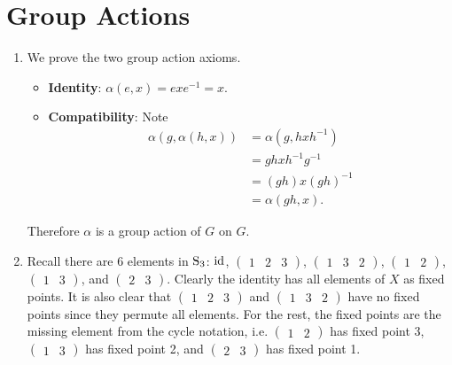\section{Group Actions}
\begin{enumerate}
    \item We prove the two group action axioms.
    \begin{itemize}
        \item \textbf{Identity}: $\alpha(e, x) = exe^{-1} = x$.
        \item \textbf{Compatibility}: Note
        \begin{align*}
            \alpha(g, \alpha(h, x)) &= \alpha(g, hxh^{-1})\\
            &= gh x h^{-1}g^{-1}\\
            &= (gh)x(gh)^{-1}\\
            &= \alpha(gh, x).
        \end{align*}
    \end{itemize}
    Therefore $\alpha$ is a group action of $G$ on $G$.

    \item Recall there are 6 elements in $\mathrm{S}_{3}$: $\mathrm{id}$, $\begin{pmatrix}1 & 2 & 3\end{pmatrix}$, $\begin{pmatrix}1 & 3 & 2\end{pmatrix}$, $\begin{pmatrix}1 & 2\end{pmatrix}$, $\begin{pmatrix}1 & 3\end{pmatrix}$, and $\begin{pmatrix}2 & 3\end{pmatrix}$. Clearly the identity has all elements of $X$ as fixed points. It is also clear that $\begin{pmatrix}1 & 2 & 3\end{pmatrix}$ and $\begin{pmatrix}1 & 3 & 2\end{pmatrix}$ have no fixed points since they permute all elements. For the rest, the fixed points are the missing element from the cycle notation, i.e. $\begin{pmatrix}1 & 2\end{pmatrix}$ has fixed point 3, $\begin{pmatrix}1 & 3\end{pmatrix}$ has fixed point 2, and $\begin{pmatrix}2 & 3\end{pmatrix}$ has fixed point 1.


\end{enumerate}

